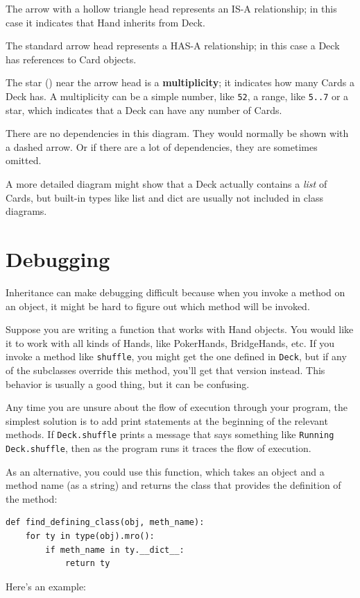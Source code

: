\documentclass[10pt]{book}
\begin{document}
The arrow with a hollow triangle head represents an IS-A
relationship; in this case it indicates that Hand inherits
from Deck.

The standard arrow head represents a HAS-A
relationship; in this case a Deck has references to Card
objects.

The star ({\tt *}) near the arrow head is a 
{\bf multiplicity}; it indicates how many Cards a Deck has.
A multiplicity can be a simple number, like {\tt 52}, a range,
like {\tt 5..7} or a star, which indicates that a Deck can
have any number of Cards.

There are no dependencies in this diagram.  They would normally
be shown with a dashed arrow.  Or if there are a lot of
dependencies, they are sometimes omitted.

A more detailed diagram might show that a Deck actually
contains a {\em list} of Cards, but built-in types
like list and dict are usually not included in class diagrams.


\section{Debugging}

Inheritance can make debugging difficult because when you invoke a
method on an object, it might be hard to figure out which method will
be invoked.  

Suppose you are writing a function that works with Hand objects.
You would like it to work with all kinds of Hands, like
PokerHands, BridgeHands, etc.  If you invoke a method like
{\tt shuffle}, you might get the one defined in {\tt Deck},
but if any of the subclasses override this method, you'll
get that version instead.  This behavior is usually a good
thing, but it can be confusing.

Any time you are unsure about the flow of execution through your
program, the simplest solution is to add print statements at the
beginning of the relevant methods.  If {\tt Deck.shuffle} prints a
message that says something like {\tt Running Deck.shuffle}, then as
the program runs it traces the flow of execution.

As an alternative, you could use this function, which takes an
object and a method name (as a string) and returns the class that
provides the definition of the method:

\begin{verbatim}
def find_defining_class(obj, meth_name):
    for ty in type(obj).mro():
        if meth_name in ty.__dict__:
            return ty
\end{verbatim}
%
Here's an example:
\end{document}
